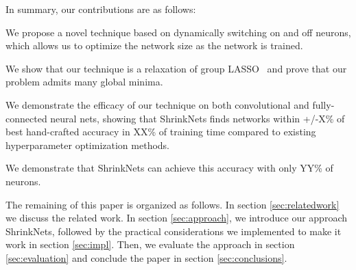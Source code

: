 In summary, our contributions are as follows: 
\begin{compactenum}
\item We propose a novel technique based on dynamically switching on and off neurons, 
which allows us to optimize the network size as the network is trained. 
\item {}
\item We show that our technique is a relaxation of group LASSO~\cite{Yuan2006} and prove that our problem admits many global minima.
\item {}
\item We demonstrate the efficacy of our technique on both convolutional and fully-connected neural nets,
showing that 
ShrinkNets finds networks within +/-X\% of best hand-crafted accuracy in XX\% of
training time compared to existing hyperparameter optimization methods. 
\item We demonstrate that ShrinkNets can achieve this accuracy with only YY\% 
of neurons. 
\item {}
\item {}
\item {}
\end{compactenum}

The remaining of this paper is organized as follows. In section
\ref{sec:relatedwork} we discuss the related work. In section
\ref{sec:approach}, we introduce our approach ShrinkNets, followed by the
practical considerations we implemented to make it work in section
\ref{sec:impl}. Then, we evaluate the approach in section \ref{sec:evaluation}
and conclude the paper in section \ref{sec:conclusions}.


